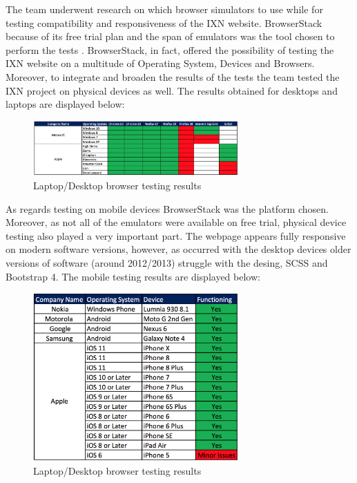 \documentclass[fontsize=10pt]{extarticle}
\numberwithin{figure}{section} %
\begin{document}
The team underwent research on which browser simulators to use while for
testing compatibility and responsiveness of the IXN website.
BrowserStack because of its free trial plan and the span of emulators
was the tool chosen to perform the tests \cite{g6}. BrowserStack, in
fact, offered the possibility of testing the IXN website on a multitude
of Operating System, Devices and Browsers. Moreover, to integrate and
broaden the results of the tests the team tested the IXN project on
physical devices as well. The results obtained for desktops and laptops
are displayed below:

\begin{figure}[H]
      \centering
      \includegraphics[trim = 0 0 0 0, clip, width=0.7\textwidth]{ph7.png}
      \caption{Laptop/Desktop browser testing results}
 \end{figure}

As regards testing on mobile devices BrowserStack was the platform
chosen. Moreover, as not all of the emulators were available on free
trial, physical device testing also played a very important part. The
webpage appears fully responsive on modern software versions, however,
as occurred with the desktop devices older versions of software (around
2012/2013) struggle with the desing, SCSS and Bootstrap 4. The mobile
testing results are displayed below:

\begin{figure}[H]
      \centering
      \includegraphics[trim = 0 0 0 0, clip, width=0.7\textwidth]{ph8.png}
      \caption{Laptop/Desktop browser testing results}
 \end{figure}
\end{document}
